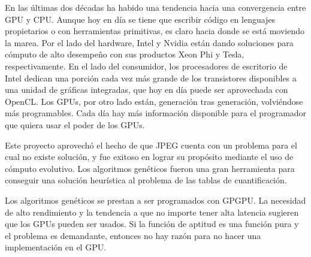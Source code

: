 En las últimas dos décadas ha habido una tendencia hacia una convergencia entre
GPU y CPU. Aunque hoy en día se tiene que escribir código en lenguajes
propietarios o con herramientas primitivas, es claro hacia donde se está
moviendo la marea. Por el lado del hardware, Intel y Nvidia están dando
soluciones para cómputo de alto desempeño con sus productos Xeon Phi y Tesla,
respectivamente. En el lado del consumidor, los procesadores de escritorio de
Intel dedican una porción cada vez más grande de los transistores disponibles a
una unidad de gráficas integradas, que hoy en día puede ser aprovechada con
OpenCL. Los GPUs, por otro lado están, generación tras generación, volviéndose
más programables. Cada día hay más información disponible para el programador
que quiera usar el poder de los GPUs.

Este proyecto aprovechó el hecho de que JPEG cuenta con un problema para el
cual no existe solución, y fue exitoso en lograr su propósito mediante el uso
de \gls{cómputo evolutivo}. Los algoritmos genéticos fueron una gran herramienta
para conseguir una solución heurística al problema de las tablas de
cuantificación.

Los algoritmos genéticos se prestan a ser programados con \gls{GPGPU}. La
necesidad de alto rendimiento y la tendencia a que no importe tener alta
latencia sugieren que los GPUs pueden ser usados. Si la función de aptitud es
una función pura y el problema es demandante, entonces no hay razón para no
hacer una implementación en el GPU.
